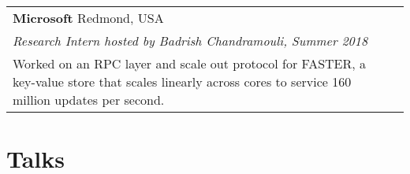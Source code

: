 \documentclass[margin,line]{res}
\begin{document}
\begin{resume}
\vspace{-2.5pt}
\begin{tabular}{@{}p{5.5in}p{4in}}
{\bf Microsoft} \dotfill Redmond, USA \\
{\small\em Research Intern hosted by Badrish Chandramouli, Summer 2018}\\
{\small Worked on an RPC layer and scale out protocol for FASTER, a
key-value store that scales linearly across cores to service 160 million
updates per second.}
\end{tabular}





\section{\sc Talks}


\end{resume}
\end{document}
